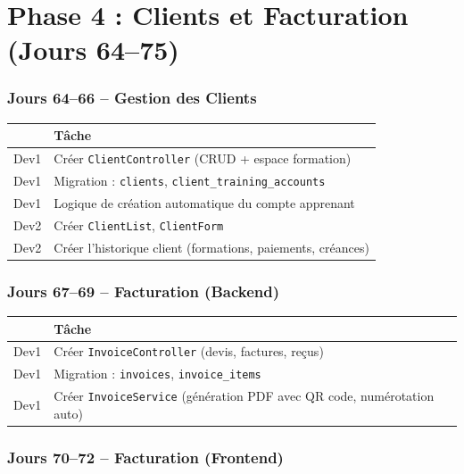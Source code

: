 \documentclass[12pt,a4paper]{report}
\begin{document}
\chapter{Phase 4 : Clients et Facturation (Jours 64--75)}

\subsection*{Jours 64--66 -- Gestion des Clients}

\begin{tabularx}{\textwidth}{l X}
    \toprule
    & \textbf{Tâche} \\
    \midrule
    Dev1 & Créer \texttt{ClientController} (CRUD + espace formation) \\
    Dev1 & Migration : \texttt{clients}, \texttt{client\_training\_accounts} \\
    Dev1 & Logique de création automatique du compte apprenant \\
    Dev2 & Créer \texttt{ClientList}, \texttt{ClientForm} \\
    Dev2 & Créer l'historique client (formations, paiements, créances) \\
    \bottomrule
\end{tabularx}

\subsection*{Jours 67--69 -- Facturation (Backend)}

\begin{tabularx}{\textwidth}{l X}
    \toprule
    & \textbf{Tâche} \\
    \midrule
    Dev1 & Créer \texttt{InvoiceController} (devis, factures, reçus) \\
    Dev1 & Migration : \texttt{invoices}, \texttt{invoice\_items} \\
    Dev1 & Créer \texttt{InvoiceService} (génération PDF avec QR code, numérotation auto) \\
    \bottomrule
\end{tabularx}

\subsection*{Jours 70--72 -- Facturation (Frontend)}
\end{document}
